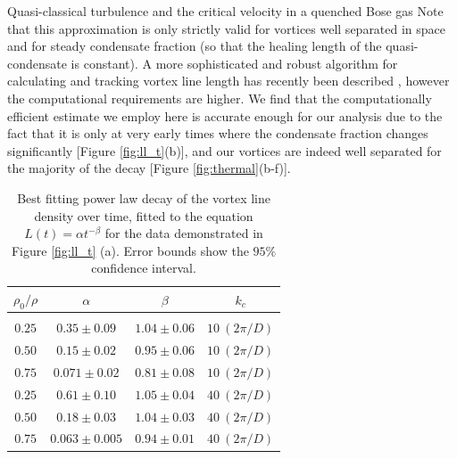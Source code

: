 \begin{chapter}{\label{cha:nonequib}Quasi-classical turbulence and the critical velocity in a quenched Bose gas}
Note that this approximation is only strictly valid for vortices well separated in space and for steady condensate fraction (so that the healing length of the quasi-condensate is constant). A more sophisticated and robust algorithm for calculating and tracking vortex line length has recently been described \cite{Kerr14,Villois16}, however the computational requirements are higher. We find that the computationally efficient estimate we employ here is accurate enough for our analysis due to the fact that it is only at very early times where the condensate fraction changes significantly [Figure \ref{fig:ll_t}(b)], and our vortices are indeed well separated for the majority of the decay [Figure \ref{fig:thermal}(b-f)].

\begin{table}
\centering
\begin{tabular}{cccc}
{\it $\rho_0/\rho$} & $\alpha$ &$\beta$ & {$k_c$} \\
\hline \\ [-2ex]
$0.25$ &  $0.35\pm0.09$  & $1.04\pm0.06$ & $10~(2\pi/D)$\\
$0.50$ &  $0.15\pm0.02$  & $0.95\pm0.06$ & $10~(2\pi/D)$\\
$0.75$ &  $0.071\pm0.02$ & $0.81\pm0.08$ & $10~(2\pi/D)$\\
$0.25$ &  $0.61\pm0.10$  & $1.05\pm0.04$ & $40~(2\pi/D)$\\
$0.50$ &  $0.18\pm0.03$  & $1.04\pm0.03$ & $40~(2\pi/D)$\\
$0.75$ &  $0.063\pm0.005$& $0.94\pm0.01$ & $40~(2\pi/D)$\\
\hline
\end{tabular}
\caption{Best fitting power law decay of the vortex line density over time, fitted to the equation $L(t) = \alpha t^{-\beta}$ for the data demonstrated in Figure \ref{fig:ll_t} (a). Error bounds show the $95\%$ confidence interval.}
\label{tbl:fits}
\end{table}


\end{chapter}
